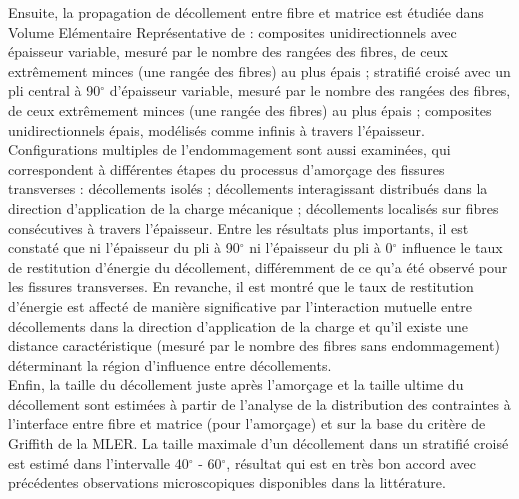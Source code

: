 Ensuite, la propagation de d\'ecollement entre fibre et matrice est \'etudi\'ee dans Volume El\'ementaire Repr\'esentative de : composites unidirectionnels avec \'epaisseur variable, mesur\'e par le nombre des rang\'ees des fibres, de ceux extr\^emement minces (une rang\'ee des fibres) au plus \'epais ; stratifi\'e crois\'e avec un pli central \`a 90$^{\circ}$ d'\'epaisseur variable, mesur\'e par le nombre des rang\'ees des fibres, de ceux extr\^emement minces (une rang\'ee des fibres) au plus \'epais ; composites unidirectionnels \'epais, mod\'elis\'es comme infinis \`a travers l'\'epaisseur. Configurations multiples de l'endommagement sont aussi examin\'ees, qui correspondent \`a diff\'erentes \'etapes du processus d'amor\c{c}age des fissures transverses : d\'ecollements isol\'es ; d\'ecollements interagissant distribu\'es dans la direction d'application de la charge m\'ecanique ; d\'ecollements localis\'es sur fibres cons\'ecutives \`a travers l'\'epaisseur. Entre les r\'esultats plus importants, il est constat\'e que ni l'\'epaisseur du pli \`a 90$^{\circ}$ ni l'\'epaisseur du pli \`a 0$^{\circ}$ influence le taux de restitution d'\'energie du d\'ecollement, diff\'eremment de ce qu'a \'et\'e observ\'e pour les fissures transverses. En revanche, il est montr\'e que le taux de restitution d'\'energie est affect\'e de mani\`ere significative par l'interaction mutuelle entre d\'ecollements dans la direction d'application de la charge et qu'il existe une distance caract\'eristique (mesur\'e par le nombre des fibres sans endommagement) d\'eterminant la r\'egion d'influence entre d\'ecollements.\\

Enfin, la taille du d\'ecollement juste apr\`es l'amor\c{c}age et la taille ultime du d\'ecollement sont estim\'ees \`a partir de l'analyse de la distribution des contraintes \`a l'interface entre fibre et matrice (pour l'amor\c{c}age) et sur la base du crit\`ere de Griffith de la MLER. La taille maximale d'un d\'ecollement dans un stratifi\'e crois\'e est estim\'e dans l'intervalle 40$^{\circ}$ - 60$^{\circ}$, r\'esultat qui est en tr\`es bon accord avec pr\'ec\'edentes observations microscopiques disponibles dans la litt\'erature.
